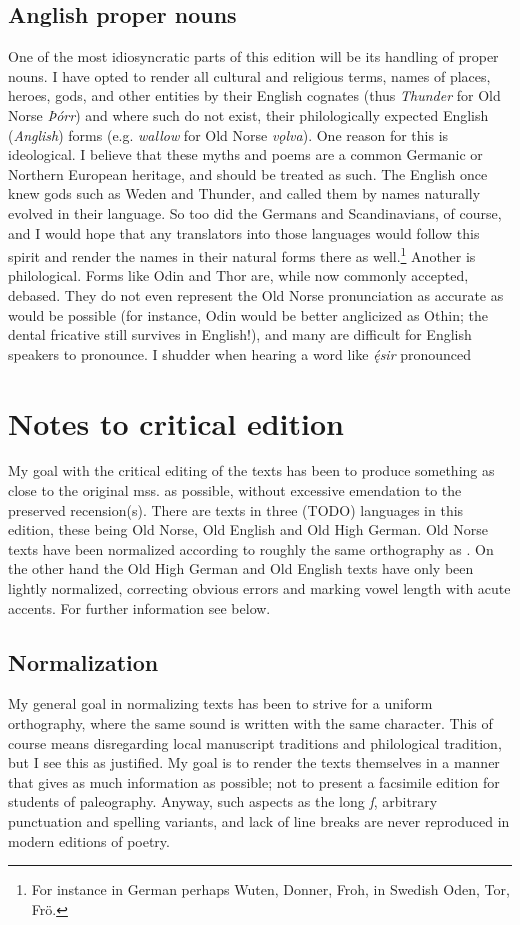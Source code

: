   \subsection{Anglish proper nouns}
    One of the most idiosyncratic parts of this edition will be its handling of proper nouns. I have opted to render all cultural and religious terms, names of places, heroes, gods, and other entities by their English cognates (thus \emph{Thunder} for Old Norse \emph{Þórr}) and where such do not exist, their philologically expected English (\emph{Anglish}) forms (e.g. \emph{wallow} for Old Norse \emph{vǫlva}).
    One reason for this is ideological. I believe that these myths and poems are a common Germanic or Northern European heritage, and should be treated as such. The English once knew gods such as Weden and Thunder, and called them by names naturally evolved in their language. So too did the Germans and Scandinavians, of course, and I would hope that any translators into those languages would follow this spirit and render the names in their natural forms there as well.\footnote{For instance in German perhaps Wuten, Donner, Froh, in Swedish Oden, Tor, Frö.}
    Another is philological. Forms like Odin and Thor are, while now commonly accepted, debased. They do not even represent the Old Norse pronunciation as accurate as would be possible (for instance, Odin would be better anglicized as Othin; the dental fricative still survives in English!), and many are difficult for English speakers to pronounce. I shudder when hearing a word like \emph{ę́sir} pronounced 

\section{Notes to critical edition}
  My goal with the critical editing of the texts has been to produce something as close to the original mss. as possible, without excessive emendation to the preserved recension(s). There are texts in three (TODO) languages in this edition, these being Old Norse, Old English and Old High German. Old Norse texts have been normalized according to roughly the same orthography as \textcite{FinnurEdda}. On the other hand the Old High German and Old English texts have only been lightly normalized, correcting obvious errors and marking vowel length with acute accents. For further information see below.

  \subsection{Normalization}
    My general goal in normalizing texts has been to strive for a uniform orthography, where the same sound is written with the same character. This of course means disregarding local manuscript traditions and philological tradition, but I see this as justified. My goal is to render the texts themselves in a manner that gives as much information as possible; not to present a facsimile edition for students of paleography. Anyway, such aspects as the long \emph{ſ}, arbitrary punctuation and spelling variants, and lack of line breaks are never reproduced in modern editions of poetry.

